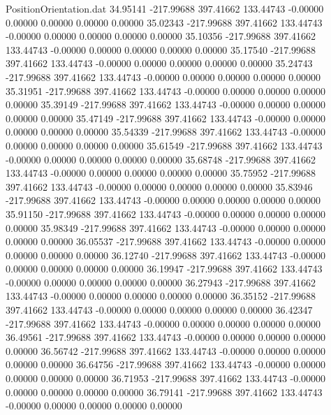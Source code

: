 \begin{filecontents}{PositionOrientation.dat}
  34.95141 -217.99688  397.41662   133.44743   -0.00000    0.00000    0.00000    0.00000    0.00000
  35.02343 -217.99688  397.41662   133.44743   -0.00000    0.00000    0.00000    0.00000    0.00000
  35.10356 -217.99688  397.41662   133.44743   -0.00000    0.00000    0.00000    0.00000    0.00000
  35.17540 -217.99688  397.41662   133.44743   -0.00000    0.00000    0.00000    0.00000    0.00000
  35.24743 -217.99688  397.41662   133.44743   -0.00000    0.00000    0.00000    0.00000    0.00000
  35.31951 -217.99688  397.41662   133.44743   -0.00000    0.00000    0.00000    0.00000    0.00000
  35.39149 -217.99688  397.41662   133.44743   -0.00000    0.00000    0.00000    0.00000    0.00000
  35.47149 -217.99688  397.41662   133.44743   -0.00000    0.00000    0.00000    0.00000    0.00000
  35.54339 -217.99688  397.41662   133.44743   -0.00000    0.00000    0.00000    0.00000    0.00000
  35.61549 -217.99688  397.41662   133.44743   -0.00000    0.00000    0.00000    0.00000    0.00000
  35.68748 -217.99688  397.41662   133.44743   -0.00000    0.00000    0.00000    0.00000    0.00000
  35.75952 -217.99688  397.41662   133.44743   -0.00000    0.00000    0.00000    0.00000    0.00000
  35.83946 -217.99688  397.41662   133.44743   -0.00000    0.00000    0.00000    0.00000    0.00000
  35.91150 -217.99688  397.41662   133.44743   -0.00000    0.00000    0.00000    0.00000    0.00000
  35.98349 -217.99688  397.41662   133.44743   -0.00000    0.00000    0.00000    0.00000    0.00000
  36.05537 -217.99688  397.41662   133.44743   -0.00000    0.00000    0.00000    0.00000    0.00000
  36.12740 -217.99688  397.41662   133.44743   -0.00000    0.00000    0.00000    0.00000    0.00000
  36.19947 -217.99688  397.41662   133.44743   -0.00000    0.00000    0.00000    0.00000    0.00000
  36.27943 -217.99688  397.41662   133.44743   -0.00000    0.00000    0.00000    0.00000    0.00000
  36.35152 -217.99688  397.41662   133.44743   -0.00000    0.00000    0.00000    0.00000    0.00000
  36.42347 -217.99688  397.41662   133.44743   -0.00000    0.00000    0.00000    0.00000    0.00000
  36.49561 -217.99688  397.41662   133.44743   -0.00000    0.00000    0.00000    0.00000    0.00000
  36.56742 -217.99688  397.41662   133.44743   -0.00000    0.00000    0.00000    0.00000    0.00000
  36.64756 -217.99688  397.41662   133.44743   -0.00000    0.00000    0.00000    0.00000    0.00000
  36.71953 -217.99688  397.41662   133.44743   -0.00000    0.00000    0.00000    0.00000    0.00000
  36.79141 -217.99688  397.41662   133.44743   -0.00000    0.00000    0.00000    0.00000    0.00000

\end{filecontents}
